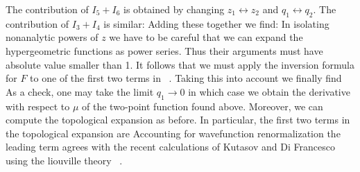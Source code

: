 The contribution of $I_5+I_6$ is obtained by changing
$z_1\leftrightarrow z_2$ and $q_1\leftrightarrow q_2$. 
The contribution of $I_3+I_4$ is similar:
\eqn\cntriii{\eqalign{
-2(-i z_2z_3)^{q_2}{\Gamma(-q_2)^2\over q_1}F(-q_2,q_1,1+q_1;-z_1/z_3)
&\CF^+(q_2;\mu)\cr
%
%
-2(-i z_1z_3)^{q_1}{\Gamma(-q_1)^2\over q_2}F(-q_1,q_2,1+q_2;-z_2/z_3)
&\CF^+(q_1;\mu)\cr
%
%
-2(-i z_1z_3)^{q_1}(-iz_2z_3)^{q_2}\Gamma(-q_1)\Gamma(-q_2)\Gamma(-|q_3|)
&\CF^+(q_1,-q_2;\mu)\cr}
%
%
}
Adding these together we find:
\eqn\cntriv{\eqalign{
2(-i z_2z_3)^{|q_3|}{(\Gamma(-|q_3|)^2\over q_1}F(q_3,-q_1,1-q_1;-z_1/z_2)
&\CF^+(|q_3|;\mu)\cr
%
%
+
2(-i z_1z_3)^{|q_3|}{(\Gamma(-|q_3|)^2\over q_2}F(q_3,-q_2,1-q_2;-z_2/z_1)
&\CF^+(|q_3|;\mu)\cr
%
%
+
2(-i z_1z_3)^{q_1}(-iz_2z_3)^{q_2}\Gamma(-q_1)\Gamma(-q_2)\Gamma(-|q_3|)
&\CF^+(|q_3|;\mu)\cr
%
+
2(-i z_2z_3)^{q_2}(-iz_1z_3)^{q_1}\Gamma(-q_1)\Gamma(-q_2)\Gamma(-|q_3|)
&\CF^+(|q_3|;\mu)\cr
%
-2(-i z_1z_3)^{q_1}(-iz_2z_3)^{q_2}\Gamma(-q_1)\Gamma(-q_2)\Gamma(-|q_3|)
&\CF^+(q_1,-q_2;\mu)\cr}
%
}
In isolating nonanalytic powers of $z$ we have to be careful that we can 
expand the hypergeometric functions as power series. Thus their 
arguments must have absolute value smaller than 1. It follows that 
we must apply the inversion formula for $F$ to one of the first 
two terms in \cntriv\ . Taking this into account we finally find
\eqn{}
As a check, one may take the limit $q_1\to 0$ in which case we
obtain the derivative with respect to $\mu$ of the two-point
function found above. Moreover, we can compute the topological 
expansion as before. In particular, the first two terms in
the topological expansion are
\eqn{}
Accounting for wavefunction renormalization the leading term 
agrees with
the recent calculations of Kutasov and Di Francesco using 
the liouville theory \kutasov\ .

